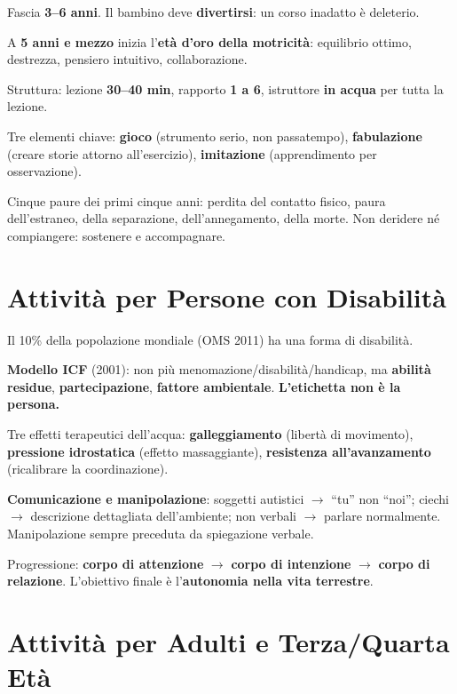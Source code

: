 \documentclass[12pt, a4paper]{article}
\begin{document}
Fascia \textbf{3--6 anni}. Il bambino deve \textbf{divertirsi}: un corso inadatto è deleterio.

A \textbf{5 anni e mezzo} inizia l'\textbf{età d'oro della motricità}: equilibrio ottimo, destrezza, pensiero intuitivo, collaborazione.

Struttura: lezione \textbf{30--40 min}, rapporto \textbf{1 a 6}, istruttore \textbf{in acqua} per tutta la lezione.

Tre elementi chiave: \textbf{gioco} (strumento serio, non passatempo), \textbf{fabulazione} (creare storie attorno all'esercizio), \textbf{imitazione} (apprendimento per osservazione).

Cinque paure dei primi cinque anni: perdita del contatto fisico, paura dell'estraneo, della separazione, dell'annegamento, della morte. Non deridere né compiangere: sostenere e accompagnare.

\section{Attività per Persone con Disabilità}

Il 10\% della popolazione mondiale (OMS 2011) ha una forma di disabilità.

\textbf{Modello ICF} (2001): non più menomazione/disabilità/handicap, ma \textbf{abilità residue}, \textbf{partecipazione}, \textbf{fattore ambientale}. \textbf{L'etichetta non è la persona.}

Tre effetti terapeutici dell'acqua: \textbf{galleggiamento} (libertà di movimento), \textbf{pressione idrostatica} (effetto massaggiante), \textbf{resistenza all'avanzamento} (ricalibrare la coordinazione).

\textbf{Comunicazione e manipolazione}: soggetti autistici $\rightarrow$ ``tu'' non ``noi''; ciechi $\rightarrow$ descrizione dettagliata dell'ambiente; non verbali $\rightarrow$ parlare normalmente. Manipolazione sempre preceduta da spiegazione verbale.

Progressione: \textbf{corpo di attenzione} $\rightarrow$ \textbf{corpo di intenzione} $\rightarrow$ \textbf{corpo di relazione}. L'obiettivo finale è l'\textbf{autonomia nella vita terrestre}.

\section{Attività per Adulti e Terza/Quarta Età}
\end{document}
